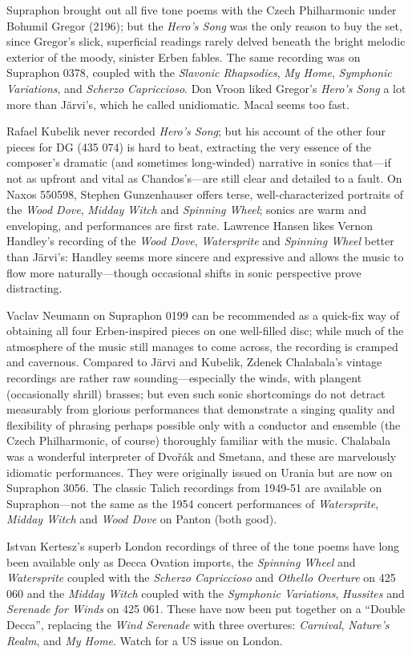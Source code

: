 \documentclass[12pt]{article}%
\begin{document}
Supraphon brought out all five tone poems with the Czech Philharmonic under Bohumil
Gregor (2196); but the {\it Hero's Song} was the only reason to buy the set, since Gregor's slick, superficial readings rarely delved beneath the bright melodic exterior of the moody, sinister
Erben fables. The same recording was on Supraphon 0378, coupled with the {\it Slavonic Rhapsodies}, {\it My Home}, {\it Symphonic Variations}, and {\it Scherzo Capriccioso}. Don Vroon liked Gregor's {\it Hero's Song} a lot more than Järvi's, which he called unidiomatic. Macal seems too fast.

Rafael Kubelik never recorded {\it Hero's Song}; but his account of the other four pieces for DG (435 074) is hard to beat, extracting the very essence of the composer's dramatic (and sometimes long-winded) narrative in sonics that---if not as upfront and vital as Chandos's---are still clear and detailed to a fault. On Naxos 550598, Stephen Gunzenhauser offers terse, well-characterized portraits of the {\it Wood Dove}, {\it Midday Witch} and {\it Spinning Wheel}; sonics are warm and enveloping, and performances are first rate. Lawrence Hansen likes Vernon Handley's recording of the {\it Wood Dove}, {\it Watersprite} and {\it Spinning Wheel} better than Järvi's: Handley seems more sincere and expressive and allows the music to flow more naturally---though occasional shifts in sonic perspective prove distracting.

Vaclav Neumann on Supraphon 0199 can be recommended as a quick-fix way of obtaining all four Erben-inspired pieces on one well-filled disc; while much of the atmosphere of the music still manages to come across, the recording is cramped and cavernous. Compared to Järvi and Kubelik, Zdenek Chalabala's vintage recordings are rather raw sounding---especially the winds, with plangent (occasionally shrill) brasses; but even such sonic shortcomings do not detract measurably from glorious performances that demonstrate a singing quality and flexibility of phrasing perhaps possible only with a conductor and ensemble (the Czech Philharmonic, of course) thoroughly familiar with the music. Chalabala was a wonderful interpreter of Dvořák and Smetana, and these
are marvelously idiomatic performances. They were originally issued on Urania but are now on Supraphon 3056. The classic Talich recordings from 1949-51 are available on Supraphon---not the same as the 1954 concert performances of {\it Watersprite}, {\it Midday Witch} and {\it Wood Dove} on Panton (both good).

Istvan Kertesz's superb London recordings of three of the tone poems have long been available only as Decca Ovation imports, the {\it Spinning Wheel} and {\it Watersprite} coupled with the {\it Scherzo Capriccioso} and {\it Othello Overture} on 425 060 and the {\it Midday Witch} coupled with the {\it Symphonic Variations}, {\it Hussites} and {\it Serenade for Winds} on 425 061. These have now been put together on a ``Double Decca'', replacing the {\it Wind Serenade} with three overtures: {\it Carnival}, {\it Nature's Realm}, and {\it My Home}.
Watch for a US issue on London.
\end{document}
